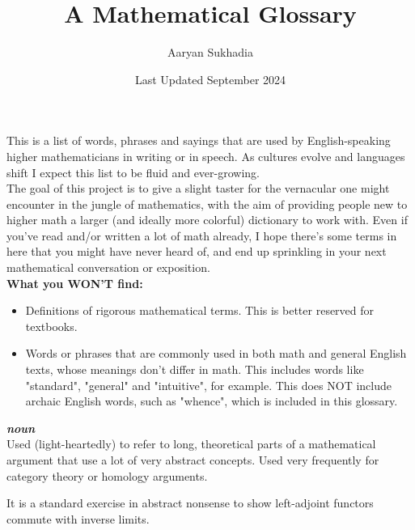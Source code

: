 \documentclass[12pt,x11names]{article}
\begin{document}
\title{A Mathematical Glossary}

\author{Aaryan Sukhadia}
\date{Last Updated September 2024}

\maketitle

This is a list of words, phrases and sayings that are used by English-speaking higher mathematicians in writing or in speech. As cultures evolve and languages shift I expect this list to be fluid and ever-growing.\\

The goal of this project is to give a slight taster for the vernacular one might encounter in the jungle of mathematics, with the aim of providing people new to higher math a larger (and ideally more colorful) dictionary to work with. Even if you've read and/or written a lot of math already, I hope there's some terms in here that you might have never heard of, and end up sprinkling in your next mathematical conversation or exposition.\\

\textbf{What you WON'T find:}
\begin{itemize}
    \item Definitions of rigorous mathematical terms. This is better reserved for textbooks.
    \item Words or phrases that are commonly used in both math and general English texts, whose meanings don't differ in math. This includes words like "standard", "general" and "intuitive", for example. This does NOT include archaic English words, such as "whence", which is included in this glossary.
\end{itemize} 


\listoftheorems[numwidth=1em, title=Index, ignoreall, show={definition}]


\newpage

\begin{definition}
\textbf{\textit{noun}}\\
Used (light-heartedly) to refer to long, theoretical parts of a mathematical argument that use a lot of very abstract concepts. Used very frequently for category theory or homology arguments.
\end{definition}

\begin{example}
It is a standard exercise in abstract nonsense to show left-adjoint functors commute with inverse limits.
\end{example}
\end{document}

